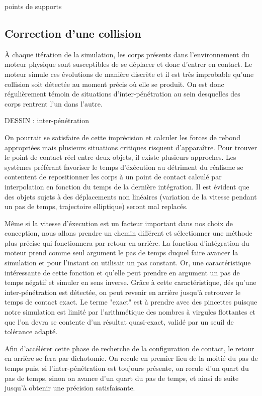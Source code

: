 %

points de supports



\subsection{Correction d'une collision}

\`A chaque itération de la simulation, les corps présents dans l'environnement du moteur physique sont susceptibles de se déplacer et donc d'entrer en contact. Le moteur simule ces évolutions de manière discrète et il est très improbable qu'une collision soit détectée au moment précis o\`u elle se produit. On est donc régulièrement témoin de situations d'inter-pénétration au sein desquelles des corps rentrent l'un dans l'autre.

DESSIN : inter-pénétration

On pourrait se satisfaire de cette imprécision et calculer les forces de rebond appropriées mais plusieurs situations critiques risquent d'apparaître. Pour trouver le point de contact réel entre deux objets, il existe plusieurs approches. Les systèmes préférant favoriser le temps d'éxécution au détriment du réalisme se contentent de repositionner les corps à un point de contact calculé par interpolation en fonction du temps de la dernière intégration. Il est évident que des objets sujets à des déplacements non linéaires (variation de la vitesse pendant un pas de temps, trajectoire elliptique) seront mal replacés.

Même si la vitesse d'éxecution est un facteur important dans nos choix de conception, nous allons prendre un chemin différent et sélectionner une méthode plus précise qui fonctionnera par retour en arrière. La fonction d'intégration du moteur prend comme seul argument le pas de temps duquel faire avancer la simulation et pour l'instant on utilisait un pas constant. Or, une caractéristique intéressante de cette fonction et qu'elle peut prendre en argument un pas de temps négatif et simuler en sens inverse. Grâce à cette caractéristique, dés qu'une inter-pénétration est détectée, on peut revenir en arrière jusqu'à retrouver le temps de contact exact. Le terme "exact" est à prendre avec des pincettes puisque notre simulation est limité par l'arithmétique des nombres à virgules flottantes et que l'on devra se contente d'un résultat quasi-exact, validé par un seuil de tolérance adapté.

Afin d'accélérer cette phase de recherche de la configuration de contact, le retour en arrière se fera par dichotomie. On recule en premier lieu de la moitié du pas de temps puis, si l'inter-pénétration est toujours présente, on recule d'un quart du pas de temps, sinon on avance d'un quart du pas de temps, et ainsi de suite jusqu'à obtenir une précision satisfaisante.


